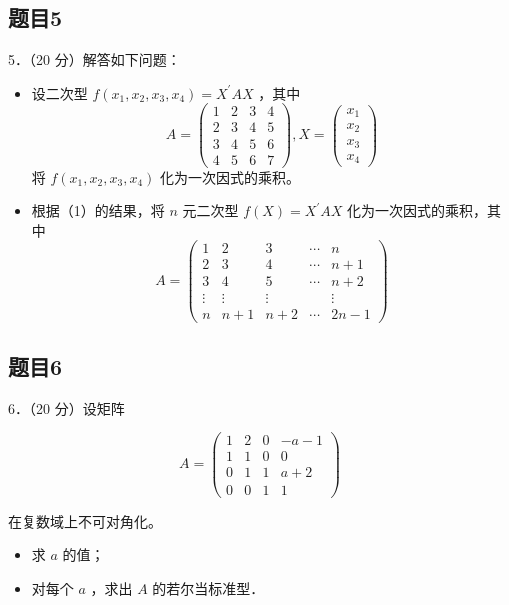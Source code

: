 \documentclass{article}
\begin{document}
\subsection{题目5}
5．（20 分）解答如下问题：

\begin{itemize}
  \item[（1）] 设二次型 \(f\left(x_{1}, x_{2}, x_{3}, x_{4}\right)=X^{\prime} A X\) ，其中
\[
A=\left(\begin{array}{llll}
1 & 2 & 3 & 4 \\
2 & 3 & 4 & 5 \\
3 & 4 & 5 & 6 \\
4 & 5 & 6 & 7
\end{array}\right), X=\left(\begin{array}{l}
x_{1} \\
x_{2} \\
x_{3} \\
x_{4}
\end{array}\right)
\]
将 \(f\left(x_{1}, x_{2}, x_{3}, x_{4}\right)\) 化为一次因式的乘积。
  \item[（2）] 根据（1）的结果，将 \(n\) 元二次型 \(f(X)=X^{\prime} A X\) 化为一次因式的乘积，其中
\[
A=\left(\begin{array}{ccccc}
1 & 2 & 3 & \cdots & n \\
2 & 3 & 4 & \cdots & n+1 \\
3 & 4 & 5 & \cdots & n+2 \\
\vdots & \vdots & \vdots & & \vdots \\
n & n+1 & n+2 & \cdots & 2 n-1
\end{array}\right)
\]
\end{itemize}

\subsection{题目6}
6．（20 分）设矩阵

\[
A=\left(\begin{array}{cccc}
1 & 2 & 0 & -a-1 \\
1 & 1 & 0 & 0 \\
0 & 1 & 1 & a+2 \\
0 & 0 & 1 & 1
\end{array}\right)
\]

在复数域上不可对角化。

\begin{itemize}
  \item[（1）] 求 \(a\) 的值；
  \item[（2）] 对每个 \(a\) ，求出 \(A\) 的若尔当标准型．
\end{itemize}
\end{document}
